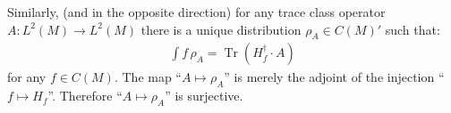 \documentclass[final,leqno]{siamltex1213}
\newcommand{\pder}[2]{\ensuremath{\frac{ \partial #1}{\partial #2}}}
\newtheorem{example}[theorem]{Example}
\DeclareMathOperator{\Tr}{Tr}
\begin{document}
Similarly, (and in the opposite direction) for any trace class operator $A:L^{2}(M) \to L^{2}(M)$ there is a unique distribution $\rho_{A} \in C(M)'$ such that: 
\begin{align}
	 \int f \, \rho_{A} = \Tr ( H_{f}^{\dagger} \cdot A )
\end{align}
for any $f \in C(M)$.
The map ``$A \mapsto \rho_{A}$'' is merely the adjoint of the injection ``$f \mapsto H_{f}$''. Therefore ``$A \mapsto \rho_{A}$'' is surjective.


%
\end{document}
